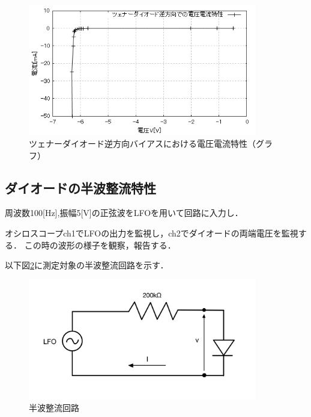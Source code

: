 \documentclass[titlepage]{jarticle}
\begin{document}
\begin{figure}[H]
    \begin{center}
        \includegraphics[width=10cm]{graph/4.png}
        \caption{ツェナーダイオード逆方向バイアスにおける電圧電流特性（グラフ）}
        \label{fig:ツェナーダイオード逆方向バイアスにおける電圧電流特性（グラフ）}
    \end{center}
\end{figure}

\subsection{ダイオードの半波整流特性}
周波数100[Hz],振幅5[V]の正弦波をLFOを用いて回路に入力し．

オシロスコープch1でLFOの出力を監視し，ch2でダイオードの両端電圧を監視する．
この時の波形の様子を観察，報告する．

以下図\ref{fig:半波整流回路}に測定対象の半波整流回路を示す．
\begin{figure}[H]
    \begin{center}
        \includegraphics[width=10cm]{image/lfo.jpg}
        \caption{半波整流回路}
        \label{fig:半波整流回路}
    \end{center}
\end{figure}
\end{document}
